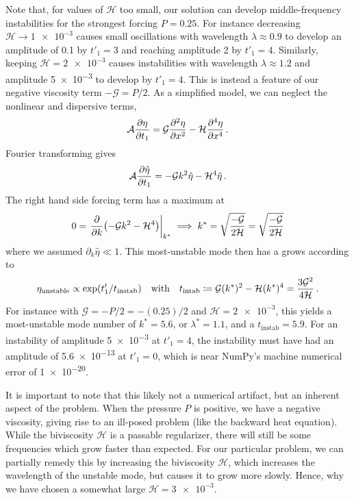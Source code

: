\documentclass{jfm}
\begin{document}
Note that, for values of $\mathcal{H}$ too small, our solution can
develop middle-frequency instabilities for the strongest forcing
$P=0.25$.
For instance decreasing $\mathcal{H} \to \num{1e-3}$ causes small
oscillations with wavelength $\lambda \approx 0.9$ to develop an
amplitude of \num{0.1} by $t'_1=3$ and reaching amplitude \num{2} by
$t'_1 = 4$.
Similarly, keeping $\mathcal{H} = \num{2e-3}$ causes instabilities with
wavelength $\lambda \approx 1.2$ and amplitude \num{5e-3} to develop by
$t'_1=4$.
This is instead a feature of our negative viscosity term $-\mathcal{G} =
P/2$.
As a simplified model, we can neglect the nonlinear and dispersive
terms,
\begin{equation}
  \mathcal{A} \pdv{\eta}{t_1} = \mathcal{G} \pdv[2]{\eta}{x} -
  \mathcal{H} \pdv[4]{\eta}{x} \,.
\end{equation}
Fourier transforming gives
\begin{equation}
  \mathcal{A} \pdv{\hat{\eta}}{t_1} = -\mathcal{G} k^2 \hat{\eta} -
  \mathcal{H} ^4 \hat{\eta} \,.
\end{equation}
The right hand side forcing term has a maximum at
\begin{equation}
  0 = \eval{\pdv{k} \pqty{-\mathcal{G} k^2 - \mathcal{H} ^4}}_{k^*}
  \implies k^* = \sqrt{\frac{-\mathcal{G}}{2\mathcal{H}}}
  = \sqrt{\frac{-\mathcal{G}}{2\mathcal{H}}}
\end{equation}
where we assumed $\partial_k \hat{\eta} \ll 1$.
This most-unstable mode then has a grows according to
\begin{equation}
  \eta_{\text{unstable}} \propto \exp(t'_1/t_{\text{instab}})
  \qq{with}
  t_{\text{intab}} \coloneqq \mathcal{G} (k^*)^2 - \mathcal{H} (k^*)^4
  = \frac{3\mathcal{G}^2}{4 \mathcal{H}} \,.
\end{equation}
For instance with $\mathcal{G} = -P/2 = -(0.25)/2$ and $\mathcal{H} =
\num{2e-3}$, this yields a most-unstable mode number of $k^* =
\num{5.6}$, or $\lambda^* = \num{1.1}$, and a $t_{\text{instab}} = 5.9$.
For an instability of amplitude \num{5e-3} at $t'_1 = 4$, the
instability must have had an amplitude of \num{5.6e-13} at $t'_1 = 0$,
which is near NumPy's machine numerical error of \num{1e-20}.

It is important to note that this likely not a numerical artifact, but
an inherent aspect of the problem.
When the pressure $P$ is positive, we have a negative viscosity, giving
rise to an ill-posed problem (\eg like the backward heat equation).
While the biviscosity $\mathcal{H}$ is a passable regularizer, there
will still be some frequencies which grow faster than expected.
For our particular problem, we can partially remedy this by increasing
the biviscosity $\mathcal{H}$, which increases the wavelength of the
unstable mode, but causes it to grow more slowly.
Hence, why we have chosen a somewhat large $\mathcal{H} = \num{3e-3}$.
\end{document}
